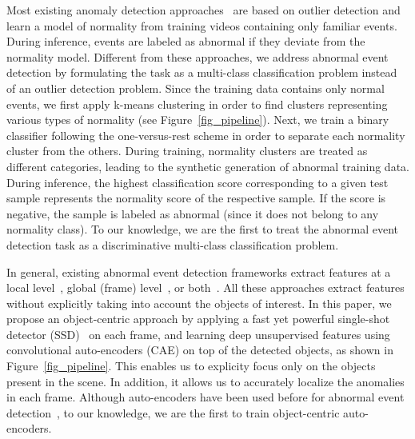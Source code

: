 \documentclass[10pt,twocolumn,letterpaper]{article}
\begin{document}
Most existing anomaly detection approaches~\cite{Antic-ICCV-2011,Cheng-CVPR-2015,Kim-CVPR-2009,Li-PAMI-2014,Lu-ICCV-2013,Mahadevan-CVPR-2010,Mehran-CVPR-2009,Xu-CVIU-2017,Zhao-CVPR-2011} are based on outlier detection and learn a model of normality from training videos containing only familiar events. During inference, events are labeled as abnormal if they deviate from the normality model. Different from these approaches, we address abnormal event detection by formulating the task as a multi-class classification problem instead of an outlier detection problem. Since the training data contains only normal events, we first apply k-means clustering in order to find clusters representing various types of normality (see Figure~\ref{fig_pipeline}). Next, we train a binary classifier following the one-versus-rest scheme in order to separate each normality cluster from the others. During training, normality clusters are treated as different categories, leading to the synthetic generation of abnormal training data.
During inference, the highest classification score corresponding to a given test sample represents the normality score of the respective sample. If the score is negative, the sample is labeled as abnormal (since it does not belong to any normality class). To our knowledge, we are the first to treat the abnormal event detection task as a discriminative multi-class classification problem.

In general, existing abnormal event detection frameworks extract features at a local level~\cite{Giorno-ECCV-2016,Dutta-AAAI-2015,Kim-CVPR-2009,Liu-BMVC-2018,Lu-ICCV-2013,Luo-ICCV-2017,Mahadevan-CVPR-2010,Sabokrou-IP-2017,Saligrama-CVPR-2012,Zhang-PR-2016}, global (frame) level~\cite{Liu-CVPR-2018,Mehran-CVPR-2009,Ravanbakhsh-WACV-2018,Ravanbakhsh-ICIP-2017,Smeureanu-ICIAP-2017}, or both~\cite{Cheng-CVPR-2015,Cong-CVPR-2011,Hasan-CVPR-2016}. All these approaches extract features without explicitly taking into account the objects of interest. In this paper, we propose an object-centric approach by applying a fast yet powerful single-shot detector (SSD)~\cite{Lin-CVPR-2017} on each frame, and learning deep unsupervised features using convolutional auto-encoders (CAE) on top of the detected objects, as shown in Figure~\ref{fig_pipeline}. This enables us to explicity focus only on the objects present in the scene. In addition, it allows us to accurately localize the anomalies in each frame. Although auto-encoders have been used before for abnormal event detection~\cite{Hasan-CVPR-2016,Sabokrou-IP-2017,Xu-CVIU-2017}, to our knowledge, we are the first to train object-centric auto-encoders.
\end{document}
